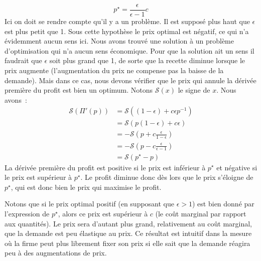 \documentclass[10pt,a4paper,notitlepage]{article}
\begin{document}
\[
p^{\star} = \frac{\epsilon}{\epsilon-1} c
\]
Ici on doit se rendre compte qu'il y a un problème. Il est supposé
plus haut que $\epsilon$ est plus petit que 1. Sous cette hypothèse le
prix optimal est négatif, ce qui n'a évidemment aucun sens ici. Nous
avons trouvé une solution à un problème d'optimisation qui n'a aucun
sens économique. Pour que la solution ait un sens il faudrait que
$\epsilon$ soit plus grand que 1, de sorte que la recette diminue
lorsque le prix augmente (l'augmentation du prix ne compense pas la
baisse de la demande). Mais dans ce cas, nous devons vérifier que le
prix qui annule la dérivée première du profit est bien un
optimum. Notons $\mathscr S (x)$ le signe de $x$. Nous avons :
\[
  \begin{split}
    \mathscr{S}\left(\Pi'(p)\right) &= \mathscr{S}\left((1-\epsilon)+c\epsilon p^{-1}\right)\\
    &= \mathscr{S}\left( p(1-\epsilon)+c\epsilon \right)\\
    &= -\mathscr{S}\left( p+c\frac{\epsilon}{1-\epsilon} \right)\\
    &= -\mathscr{S}\left( p-c\frac{\epsilon}{\epsilon-1} \right)\\
    &= \mathscr{S}\left(p^{\star}-p \right)
  \end{split}
\]
La dérivée première du profit est positive si le prix est inférieur à
$p^{\star}$ et négative si le prix est supérieur à $p^{\star}$. Le
profit diminue donc dès lors que le prix s'éloigne de $p^{\star}$, qui
est donc bien le prix qui maximise le profit.\newline

Notons que si le prix optimal positif (en supposant que $\epsilon>1$)
est bien donné par l'expression de $p^{\star}$, alors ce prix est
supérieur à $c$ (le coût marginal par rapport aux quantités). Le prix
sera d'autant plus grand, relativement au coût marginal, que la
demande est peu élastique au prix. Ce résultat est intuitif dans la
mesure où la firme peut plus librement fixer son prix si elle sait que la
demande réagira peu à des augmentations de prix.  
\end{document}
